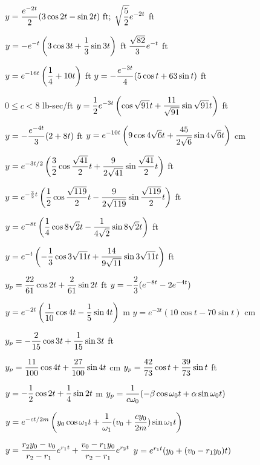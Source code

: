 \medskip

  $y=\displaystyle{\frac{e^{-2t}}{2}(3\cos2t-\sin2t)\mbox{ ft};
\;\sqrt{\frac{5}{2}}e^{-2t}}$ ft

  $y=\displaystyle{-e^{-t}\left(3\cos3t+\frac{1}{3}\sin
3t\right)\mbox{ ft}\;\frac{\sqrt{82}}{3}e^{-t}}$ ft

  $y=\displaystyle{e^{-16t}\left(\frac{1}{4}+10t\right)}$ ft
  $y=\displaystyle{-\frac{e^{-3t}}{4}(5\cos t+63\sin t)}$ ft

  $0\le c<8$ lb-sec/ft
  $y=\displaystyle{\frac{1}{2}e^{-3t}\left(\cos\sqrt{91}t+\frac{11}{\sqrt{91}}\sin\sqrt{91}t\right)}$ ft

  $y=-\displaystyle{\frac{e^{-4t}}{3}(2+8t)}$ ft
  $y=\displaystyle{e^{-10t}\left(9\cos4\sqrt{6}t+\frac{45}{2\sqrt{6}}\sin4\sqrt{6}t\right)}$ cm

  $\displaystyle{y=e^{-3t/2}\left(\frac{3}{2}\cos
\frac{\sqrt{41}}{2}t
+\frac{9}{2\sqrt{41}}\sin\frac{\sqrt{41}}{2}t\right)}$ ft

  $y=\displaystyle{e^{-\frac{3}{2}t}\left(\frac{1}{2}\cos
\frac{\sqrt{119}}{2}t-\frac{9}{2\sqrt{119}}\sin\frac{\sqrt{119}}{2}t\right)}$ ft

  $\displaystyle{y=e^{-8t}\left(\frac{1}{4}\cos8\sqrt{2}t-\frac{1}{4\sqrt{2}}\sin8\sqrt{2}t\right)}$ ft

  $\displaystyle{y=e^{-t}\left(-\frac{1}{3}\cos3\sqrt{11}t+
\frac{14}{9\sqrt{11}}\sin3\sqrt{11}t\right)}$ ft

 $\displaystyle{y_{p}=\frac{22}{61}\cos2t+\frac{2}{61}\sin2t}$ ft
 $y=-\displaystyle\frac{2}{3}(e^{-8t}-2e^{-4t})$

  $y=\displaystyle{e^{-2t}\left(\frac{1}{10}\cos
4t-\frac{1}{5}\sin4t\right)}$ m
 $y=e^{-3t}(10\cos t-70\sin t)$ cm

  $\displaystyle{y_{p}=-\frac{2}{15}\cos3t+\frac{1}{15}\sin3t}$ ft

  $y_{p}=\displaystyle{\frac{11}{100}\cos4t+\frac{27}{100}\sin4t}$ cm
  $\displaystyle{y_{p}=\frac{42}{73}\cos t+\frac{39}{73}\sin t}$ ft

 $y=\displaystyle{-\frac{1}{2}\cos2t+\frac{1}{4}\sin2t}$ m
  $\displaystyle{y_{p}=\frac{1}{c\omega_{0}}(-\beta\cos\omega_{0}t+
\alpha\sin\omega_{0}t)}$

  $y=\displaystyle{e^{-ct/2m}
\left(y_{0}\cos\omega_{1}t+\frac{1}{\omega_{1}}(v_{0}+\frac{cy_{0}}{2m})\sin\omega_{1}t\right)}$

  $y=\displaystyle{\frac{r_{2}y_{0}-v_{0}}{r_{2}-r_{1}}
e^{r_{1}t}+\frac{v_{0}-r_{1}y_{0}}{r_{2}-r_{1}}e^{r_{2}t}}$
  $y=e^{r_{1}t}\displaystyle{\left(y_{0}+(v_{0}-r_{1}y_{0})t\right)}$

